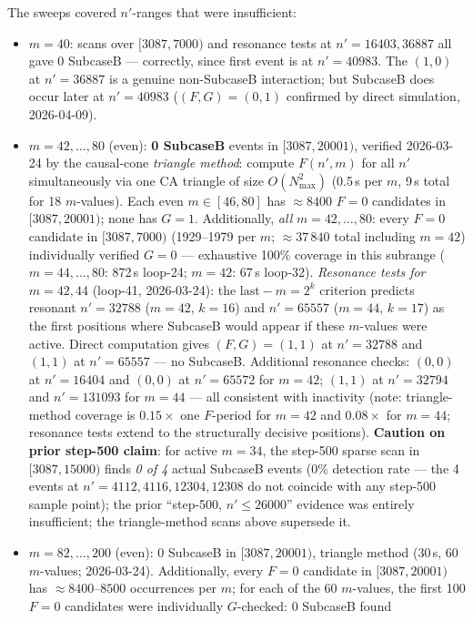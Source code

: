 \documentclass[11pt]{article}
\theoremstyle{plain}
\theoremstyle{definition}
\begin{document}
The sweeps covered $n'$-ranges that were insufficient:
\begin{itemize}
\item $m=40$: scans over $[3087,7000)$ and resonance tests at $n'=16403, 36887$ all gave
  0 SubcaseB — correctly, since first event is at $n'=40983$.
  The $(1,0)$ at $n'=36887$ is a genuine non-SubcaseB interaction; but SubcaseB does occur
  later at $n'=40983$ ($(F,G)=(0,1)$ confirmed by direct simulation, 2026-04-09).
\item $m=42,\ldots,80$ (even): \textbf{0 SubcaseB} events in $[3087, 20001)$, verified
  2026-03-24 by the causal-cone \emph{triangle method}: compute $F(n',m)$ for all $n'$
  simultaneously via one CA triangle of size $O(N_{\max}^2)$ (0.5\,s per $m$, 9\,s total for
  18 $m$-values).  Each even $m\in[46,80]$ has ${\approx}8400$ $F=0$ candidates in $[3087,20001)$;
  none has $G=1$.  Additionally, \emph{all} $m=42,\ldots,80$: every $F=0$ candidate
  in $[3087, 7000)$ (1929--1979 per $m$; ${\approx}37\,840$ total including $m=42$)
  individually verified $G=0$ — exhaustive 100\% coverage in this subrange
  ($m=44,\ldots,80$: 872\,s loop-24; $m=42$: 67\,s loop-32).
  \emph{Resonance tests for $m=42,44$} (loop-41, 2026-03-24): the $\mathrm{last}{-}m=2^k$
  criterion predicts resonant $n'=32788$ ($m=42$, $k=16$) and $n'=65557$ ($m=44$, $k=17$)
  as the first positions where SubcaseB would appear if these $m$-values were active.
  Direct computation gives $(F,G)=(1,1)$ at $n'=32788$ and $(1,1)$ at $n'=65557$ — no SubcaseB.
  Additional resonance checks: $(0,0)$ at $n'=16404$ and $(0,0)$ at $n'=65572$ for $m=42$;
  $(1,1)$ at $n'=32794$ and $n'=131093$ for $m=44$ — all consistent with inactivity
  (note: triangle-method coverage is $0.15{\times}$ one $F$-period for $m=42$ and $0.08{\times}$
  for $m=44$; resonance tests extend to the structurally decisive positions).
  \textbf{Caution on prior step-500 claim}: for active $m=34$, the step-500 sparse scan
  in $[3087,15000)$ finds \emph{0 of 4} actual SubcaseB events (0\% detection rate —
  the 4 events at $n'=4112,4116,12304,12308$ do not coincide with any step-500 sample
  point); the prior ``step-500, $n'\leq 26000$'' evidence was entirely insufficient;
  the triangle-method scans above supersede it.
\item $m=82,\ldots,200$ (even): 0 SubcaseB in $[3087, 20001)$, triangle method (30\,s,
  60 $m$-values; 2026-03-24).  Additionally, every $F=0$ candidate in $[3087,20001)$
  has ${\approx}8400$--$8500$ occurrences per $m$; for each of the 60 $m$-values,
  the first 100 $F=0$ candidates were individually $G$-checked: 0 SubcaseB found

\end{itemize}
\end{document}
